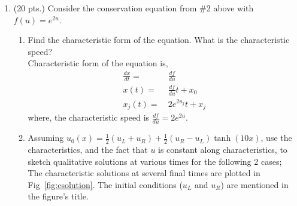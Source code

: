 \documentclass[11pt]{article}
\begin{document}
\begin{enumerate}
  \item {\color{red}(20 pts.) Consider the conservation equation from \#2 above with $f(u) = e^{2u}$.}
    \begin{enumerate}
      \item {\color{blue}Find the characteristic form of the equation. What is the characteristic speed?} \\
      Characteristic form of the equation is, 
      \begin{align*}
          \frac{dx}{dt} =& \ \frac{df}{du} \\
          x(t) =& \ \frac{df}{du}t + x_0 \\
          x_j(t) =& \ 2e^{2u_j}t + x_j
      \end{align*}
      where, the characteristic speed is $\frac{df}{du} = 2e^{2u}$.
      \item {\color{blue}Assuming $u_0(x)=\frac{1}{2}(u_L+u_R)+\frac{1}{2}(u_R-u_L)\tanh(10x)$, use the characteristics, and the fact that $u$ is constant along characteristics, to sketch qualitative solutions at various times for the following 2 cases;} \\
      The characteristic solutions at several final times are plotted in Fig~\ref{fig:csolution}. The initial conditions ($u_L $ and $u_R$) are mentioned in the figure's title.


\end{enumerate}
\end{enumerate}
\end{document}
